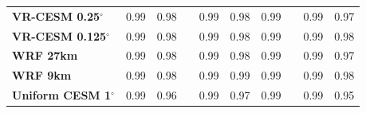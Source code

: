 \documentclass[draft,ms]{agutex}   %
\begin{document}
\begin{table}
\begin{center}
\begin{tabular*}{5.5in}{l @{\extracolsep{\fill}}ccccccccc}
\hline \textbf{VR-CESM 0.25$^\circ$} & 0.99 & 0.98 & & 0.99 & 0.98 & 0.99 & & 0.99 & 0.97 \\
\textbf{VR-CESM 0.125$^\circ$} \quad & 0.99 & 0.98 & & 0.99 & 0.98 & 0.99 & & 0.99 & 0.98 \\
\textbf{WRF 27km} & 0.99 & 0.98 & & 0.99 & 0.98 & 0.99 & & 0.99 & 0.97 \\
\textbf{WRF 9km} & 0.99 & 0.98 & & 0.99 & 0.99 & 0.99 & & 0.99 & 0.98 \\
\textbf{Uniform CESM 1$^\circ$} & 0.99 & 0.96 & & 0.99 & 0.97 & 0.99 & & 0.99 & 0.95 \\
\hline
\end{tabular*}
\end{center}
\end{table}


\end{document}
